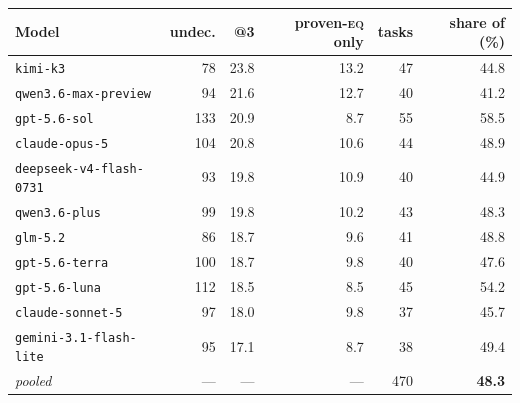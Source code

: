 \begin{tabular}{lrrrrr}
\toprule
Model & undec. & \usable{}@3 & proven-\textsc{eq} only & tasks & share of \usable{} (\%) \\
\midrule
\texttt{kimi-k3} & 78 & 23.8 & 13.2 & 47 & 44.8 \\
\texttt{qwen3.6-max-preview} & 94 & 21.6 & 12.7 & 40 & 41.2 \\
\texttt{gpt-5.6-sol} & 133 & 20.9 & 8.7 & 55 & 58.5 \\
\texttt{claude-opus-5} & 104 & 20.8 & 10.6 & 44 & 48.9 \\
\texttt{deepseek-v4-flash-0731} & 93 & 19.8 & 10.9 & 40 & 44.9 \\
\texttt{qwen3.6-plus} & 99 & 19.8 & 10.2 & 43 & 48.3 \\
\texttt{glm-5.2} & 86 & 18.7 & 9.6 & 41 & 48.8 \\
\texttt{gpt-5.6-terra} & 100 & 18.7 & 9.8 & 40 & 47.6 \\
\texttt{gpt-5.6-luna} & 112 & 18.5 & 8.5 & 45 & 54.2 \\
\texttt{claude-sonnet-5} & 97 & 18.0 & 9.8 & 37 & 45.7 \\
\texttt{gemini-3.1-flash-lite} & 95 & 17.1 & 8.7 & 38 & 49.4 \\
\midrule
\textit{pooled} & --- & --- & --- & 470 & \textbf{48.3} \\
\bottomrule
\end{tabular}
